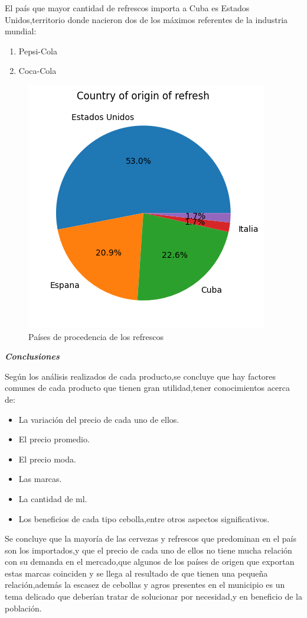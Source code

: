\documentclass[10pt]{beamer}
\begin{document}
   		
   	\begin{frame}
   		
   		El país que mayor cantidad de refrescos importa a Cuba es Estados Unidos,territorio donde nacieron dos de los máximos referentes de la industria mundial:
   		
   		\begin{enumerate}
   			\item{Pepsi-Cola}
   			\item{Coca-Cola}
   		\end{enumerate}
   		
   		\begin{figure}
   			\centering
   			\includegraphics[width=0.5\linewidth]{FIGURA/países refrescos}
   			\caption{Países de procedencia de los refrescos}
   			\label{fig:paises-refrescos}
   		\end{figure}
   		
   	\end{frame}
   	
   	
   	\begin{frame}{\textbf{\textit{Conclusiones}}}
   		
   		Según los análisis realizados de cada producto,se concluye que hay factores comunes de cada producto que tienen gran utilidad,tener conocimientos acerca de:
   		
   		\begin{itemize}
   			\item{La variación del precio de cada uno de ellos.}
   			\item{El precio promedio.}
   			\item{El precio moda.}
   			\item{Las marcas.}
   			\item{ La cantidad de ml.}
   			\item{Los beneficios de cada tipo cebolla,entre otros aspectos significativos.}
   		\end{itemize}
   		
   		  Se concluye que la  mayoría de las cervezas y refrescos que predominan en el país son los importados,y que el precio de cada uno de ellos no tiene mucha relación con su demanda en el mercado,que algunos de los países de origen que exportan estas marcas coinciden y se llega al resultado de que tienen una pequeña relación,además la escasez de cebollas y agros presentes en el municipio es un tema delicado que deberían tratar de solucionar por necesidad,y en beneficio de la población.
   		
   	\end{frame}
   	
  
\end{document}
